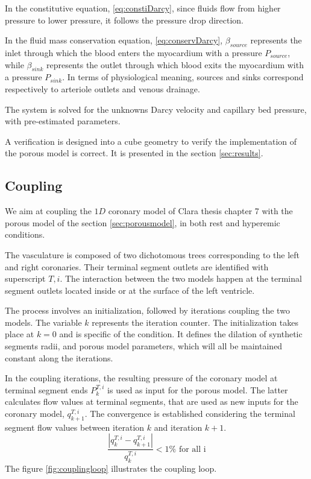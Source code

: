 \documentclass[a4paper, 11pt]{article} %
\begin{document}
In the constitutive equation, \ref{eq:constiDarcy}, since fluids flow from higher pressure to lower pressure, it follows the pressure drop direction. 

In the fluid mass conservation equation, \ref{eq:conservDarcy},  $\beta_{source}$ represents the inlet through which the blood enters the myocardium with a pressure $P_{source}$, while $\beta_{sink}$ represents the outlet through which blood exits the myocardium with a pressure $P_{sink}$. In terms of physiological meaning, sources and sinks  correspond respectively to arteriole outlets and venous drainage. 

The system is solved for the unknowns Darcy velocity and capillary bed pressure, with pre-estimated parameters.

A verification is designed into a cube geometry to verify the implementation of the porous model is correct. It is presented in the section \ref{sec:results}.


\subsection{Coupling}

We aim at coupling the $1D$ coronary model of Clara thesis chapter 7 with the porous model of the section \ref{sec:porousmodel}, in both rest and hyperemic conditions.

The vasculature is composed of two dichotomous trees corresponding to the left and right coronaries. Their terminal segment outlets are identified with superscript $T,i$. The interaction between the two models happen at the terminal segment outlets located inside or at the surface of the left ventricle.

The process involves an initialization, followed by iterations coupling the two models. The variable $k$ represents the iteration counter. 
The initialization takes place at $k=0$ and is specific of the condition. It defines the dilation of synthetic segments radii, and porous model parameters, which will all be maintained constant along the iterations.

In the coupling iterations, the resulting pressure of the coronary model at terminal segment ends $P^{T,i}_k$ is used as input for the porous model. The latter calculates flow values at terminal segments, that are used as new inputs for the coronary model, $q^{T,i}_{k+1}$. The convergence is established considering the terminal segment flow values between iteration $k$ and iteration $k+1$. 
\begin{equation}
\frac{\left\lvert q^{T,i}_{k} - q^{T,i}_{k+1} \right\rvert}{q^{T,i}_k} < 1 \% \text{ for all i}
\end{equation}
The figure \ref{fig:couplingloop} illustrates the coupling loop.
\end{document}
